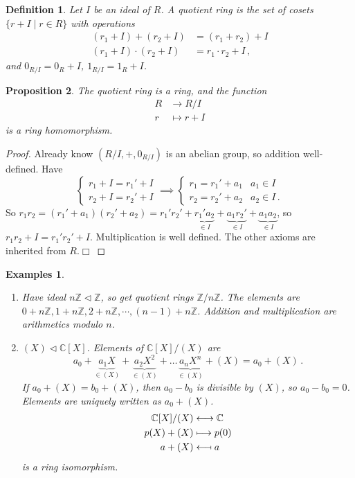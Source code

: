 \documentclass{article}
\theoremstyle{plain}\theoremheaderfont{\normalfont\itshape}\theorembodyfont{\rmfamily}\theoremseparator{.}\newtheorem*{rem}{Remark}\newtheorem*{ex}{Example}\newtheorem*{proof}{Proof}\newtheorem*{altp}{Alternative proof}\newtheorem*{nonex}{Non-Example}
\theoremstyle{plain}\theoremheaderfont{\normalfont\bfseries}\theorembodyfont{\rmfamily}\theoremseparator{.}\newtheorem{thm}{Theorem}[section]\newtheorem{lem}[thm]{Lemma}\newtheorem{prop}[thm]{Proposition}\newtheorem*{cor}{Corollary}\newtheorem{defn}[thm]{Definition}\newtheorem{clm}[thm]{Claim}\newtheorem{clminproof}{Claim}\newtheorem*{notn}{Notation}\newtheorem*{exer}{Exercise}\newtheorem*{lemnn}{Lemma}
\theoremstyle{break}\theoremheaderfont{\normalfont\itshape}\theorembodyfont{\rmfamily}\theoremseparator{.\medskip}\newtheorem*{proofskip}{Proof}\newtheorem*{exs}{Examples}\newtheorem*{rems}{Remarks}\newtheorem*{obs}{Observations}
\theoremstyle{break}\theoremheaderfont{\normalfont\bfseries}\theorembodyfont{\rmfamily}\theoremseparator{.\medskip}\newtheorem{lemskip}[thm]{Lemma}\newtheorem{defnskip}[thm]{Definition}\newtheorem{propskip}[thm]{Proposition}\newtheorem{thmskip}[thm]{Theorem}
\numberwithin{equation}{section}
\newcommand{\qed}{\hfill\ensuremath{\Box}}
\newcommand{\ZZ}{\mathbb{Z}}
\newcommand{\CC}{\mathbb{C}}
\newcommand{\longmappedfrom}{\;\reflectbox{\(\longmapsto\)}\;}
\begin{document}
    \begin{defn}
        Let \(I\) be an ideal of \(R\). A \textit{quotient ring} is the set of cosets \(\{r+I\mid r\in R\}\) with operations
        \begin{align*}
            (r_1+I)+(r_2+I)&=(r_1+r_2)+I\\
            (r_1+I)\cdot(r_2+I)&=r_1\cdot r_2+I\,,
        \end{align*}
        and \(0_{R/I}=0_R+I\), \(1_{R/I}=1_R+I\).
    \end{defn}
    \begin{prop}
        The quotient ring is a ring, and the function
        \begin{align*}
            R&\longrightarrow R/I\\
            r&\longmapsto r+I
        \end{align*}
        is a ring homomorphism.
    \end{prop}
    \begin{proof}
        Already know \((R/I,+,0_{R/I})\) is an abelian group, so addition well-defined. Have
        \[\begin{cases}
            r_1+I=r_1'+I\\
            r_2+I=r_2'+I
        \end{cases}\implies\begin{cases}
            r_1=r_1'+a_1 & a_1\in I\\
            r_2=r_2'+a_2 & a_2\in I\,.
        \end{cases}\]
        So \(r_1r_2=(r_1'+a_1)(r_2'+a_2)=r_1'r_2'+\underbrace{r_1'a_2}_{\in I}+\underbrace{a_1r_2'}_{\in I}+\underbrace{a_1a_2}_{\in I}\), so \(r_1r_2+I=r_1'r_2'+I\). Multiplication is well defined. The other axioms are inherited from \(R\).\qed
    \end{proof}

    \begin{exs}
        \begin{enumerate}[topsep=0pt,label=(\roman*)]
            \item Have ideal \(n\ZZ \lhd \ZZ\), so get quotient rings \(\ZZ / n\ZZ\). The elements are \(0 + n\ZZ, 1 + n\ZZ, 2 + n\ZZ, \cdots, (n - 1) + n\ZZ\).
            Addition and multiplication are arithmetics modulo \(n\).
            \item \((X)\lhd\CC[X]\). Elements of \(\CC[X]/(X)\) are
            \[a_0+\underbrace{a_1 X}_{\in(X)}+\underbrace{a_2X^2}_{\in(X)}+\dots\underbrace{a_nX^n}_{\in(X)}+(X)=a_0+(X)\,.\]
            If \(a_0+(X)=b_0+(X)\), then \(a_0-b_0\) is divisible by \((X)\), so \(a_0-b_0=0\). Elements are uniquely written as \(a_0+(X)\).
            \begin{align*}
                \CC[X]/(X)&\longleftrightarrow\CC\\
                p(X)+(X)&\longmapsto p(0)\\
                a+(X)&\longmappedfrom a
            \end{align*}
            is a ring isomorphism.
        \end{enumerate}
    \end{exs}
\end{document}
